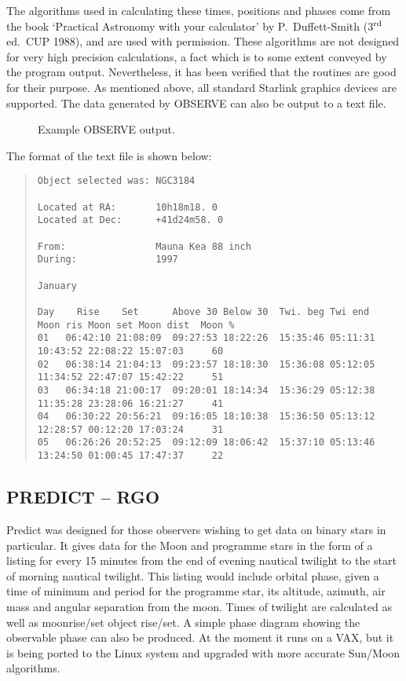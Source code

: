 \documentclass[twoside,11pt]{article}
\newcommand{\xref}[3]{#1}
\newcommand{\xlabel}[1]{}
\newcommand{\OBSERVEref}{\xref{OBSERVE}{sun146}{}}
\begin{document}
The algorithms used in calculating these times, positions and phases come
from the book `Practical Astronomy with your calculator' by
P.~Duffett-Smith (3$^{\rm rd}$ ed.~CUP 1988), and are used with permission.
These algorithms are not designed for very high precision calculations, a
fact which is to some extent conveyed by the program output. Nevertheless,
it has been verified that the routines are good for their purpose. 
As mentioned above, all standard Starlink graphics devices are supported. 
The data generated by {\OBSERVEref} can also be output to a text file. 

\begin{figure}[htbp]
\leavevmode
\centering {}
\caption{Example OBSERVE output.}
\end{figure}

The format of the text file is shown below:
{\scriptsize
\begin{quote}
\begin{verbatim}
Object selected was: NGC3184
 
Located at RA:       10h18m18. 0
Located at Dec:      +41d24m58. 0
 
From:                Mauna Kea 88 inch
During:              1997
 
January                                                                   
 
Day    Rise    Set      Above 30 Below 30  Twi. beg Twi end   Moon ris Moon set Moon dist  Moon %
01   06:42:10 21:08:09  09:27:53 18:22:26  15:35:46 05:11:31  10:43:52 22:08:22 15:07:03     60
02   06:38:14 21:04:13  09:23:57 18:18:30  15:36:08 05:12:05  11:34:52 22:47:07 15:42:22     51
03   06:34:18 21:00:17  09:20:01 18:14:34  15:36:29 05:12:38  11:35:28 23:28:06 16:21:27     41
04   06:30:22 20:56:21  09:16:05 18:10:38  15:36:50 05:13:12  12:28:57 00:12:20 17:03:24     31
05   06:26:26 20:52:25  09:12:09 18:06:42  15:37:10 05:13:46  13:24:50 01:00:45 17:47:37     22
\end{verbatim}
\end{quote}
}

\subsection{PREDICT -- RGO} \xlabel{PREDICT}
\label{sec:predict}
 
Predict was designed for those observers wishing to get data on binary stars
in particular. It gives data for the Moon and programme stars in the form of
a listing for every 15 minutes from the end of evening nautical twilight to
the start of morning nautical twilight. This listing would include orbital
phase, given a time of minimum and period for the programme star, its
altitude, azimuth, air mass and angular separation from the moon. Times of
twilight are calculated as well as moonrise/set object rise/set. A simple
phase diagram showing the observable phase can also be produced.  At the
moment it runs on a VAX, but it is being ported to the Linux system and upgraded 
with more accurate Sun/Moon algorithms. 
\end{document}
